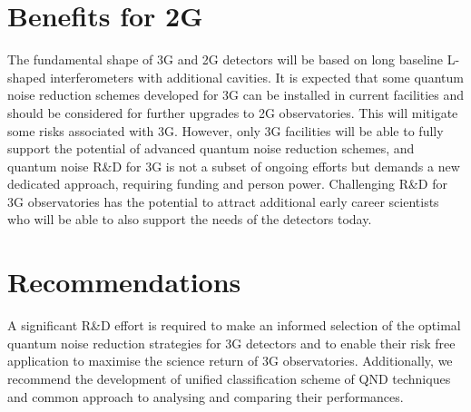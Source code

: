 \section{Benefits for 2G} 
The fundamental shape of 3G and 2G detectors will be based on long baseline L-shaped interferometers with additional cavities. It is expected that some quantum noise reduction schemes developed for 3G can be installed in current facilities and should be considered for further upgrades to 2G observatories. This will mitigate some risks associated with 3G. However, only 3G facilities will be able to fully support the potential of advanced quantum noise reduction schemes, and quantum noise R\&D for 3G is not a subset of ongoing efforts but demands a new dedicated approach, requiring funding and person power. Challenging R\&D for 3G observatories has the potential to attract additional early career scientists who will be able to also support the needs of the detectors today. 

\section{Recommendations}
A significant R\&D effort is required to make an informed selection of the optimal quantum noise reduction strategies for 3G detectors and to enable their risk free application to maximise the science return of 3G observatories. Additionally, we recommend the development of unified classification scheme of QND techniques and common approach to analysing and comparing their performances.  




